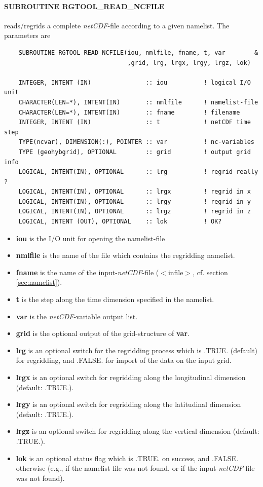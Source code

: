 \documentclass[12pt, a4paper]{article}
\begin{document}
\paragraph{\bf SUBROUTINE RGTOOL\_READ\_NCFILE} reads/regrids a complete
{\it netCDF}-file according to a given namelist. The parameters are
\begin{verbatim}
    SUBROUTINE RGTOOL_READ_NCFILE(iou, nmlfile, fname, t, var        &
                                  ,grid, lrg, lrgx, lrgy, lrgz, lok)

    INTEGER, INTENT (IN)               :: iou          ! logical I/O unit
    CHARACTER(LEN=*), INTENT(IN)       :: nmlfile      ! namelist-file
    CHARACTER(LEN=*), INTENT(IN)       :: fname        ! filename
    INTEGER, INTENT (IN)               :: t            ! netCDF time step
    TYPE(ncvar), DIMENSION(:), POINTER :: var          ! nc-variables
    TYPE (geohybgrid), OPTIONAL        :: grid         ! output grid info
    LOGICAL, INTENT(IN), OPTIONAL      :: lrg          ! regrid really ?
    LOGICAL, INTENT(IN), OPTIONAL      :: lrgx         ! regrid in x
    LOGICAL, INTENT(IN), OPTIONAL      :: lrgy         ! regrid in y
    LOGICAL, INTENT(IN), OPTIONAL      :: lrgz         ! regrid in z
    LOGICAL, INTENT (OUT), OPTIONAL    :: lok          ! OK?

\end{verbatim}
%
\begin{itemize}
\item {\bf iou} is the I/O unit for opening the namelist-file
\item {\bf nmlfile} is the name of the file which contains the regridding
                    namelist.
\item {\bf fname} is the name of the input-{\it netCDF}-file
       ($<$infile$>$, cf. section \ref{sec:namelist}).
\item {\bf t} is the step along the time dimension specified in the namelist.
\item {\bf var} is the {\it netCDF}-variable output list.
\item {\bf grid} is the optional output of the grid-structure
                 of {\bf var}.
\item {\bf lrg} is an optional switch for the regridding process which
                is .TRUE. (default) for regridding, and .FALSE. for
                import of the data on the input grid.
\item {\bf lrgx} is an optional switch for regridding along the longitudinal
               dimension (default: .TRUE.).
\item {\bf lrgy} is an optional switch for regridding along the latitudinal
               dimension (default: .TRUE.).
\item {\bf lrgz} is an optional switch for regridding along the vertical
               dimension (default: .TRUE.).
\item {\bf lok} is an optional status flag which is .TRUE. on success, and
                .FALSE. otherwise (e.g., if the namelist file was not found,
                or if the input-{\it netCDF}-file was not found).
\end{itemize}
\end{document}
